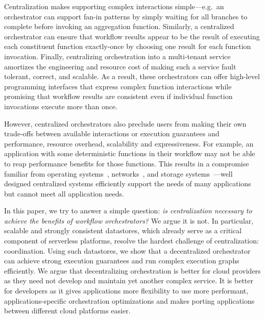 Centralization makes supporting complex interactions simple---e.g.\ an
orchestrator can support fan-in patterns by simply waiting for all branches to
complete before invoking an aggregation function. Similarly, a centralized
orchestrator can ensure that workflow results appear to be the result of
executing each constituent function exactly-once by choosing one result for
each function invocation. Finally, centralizing orchestration into a
multi-tenant service amortizes the engineering and resource cost of making such
a service fault tolerant, correct, and scalable. As a result, these
orchestrators can offer high-level programming interfaces that express complex
function interactions while promising that workflow results are consistent even
if individual function invocations execute more than once.


However, centralized orchestrators also preclude users from making their own
trade-offs between available interactions or execution guarantees and
performance, resource overhead, scalability and expressiveness. For example, an
application with some deterministic functions in their workflow may not be able
to reap performance benefits for those functions. This results in a compromise
familiar from operating systems~\cite{exokernel,spin},
networks~\cite{active-networks,sdn}, and storage
systems~\cite{comet,splinter}---well designed centralized systems efficiently
support the needs of many applications but cannot meet all application needs.
%

In this paper, we try to answer a simple question: \textit{is centralization
\emph{necessary} to achieve the benefits of workflow  orchestrators?} We argue
it is not. In particular, scalable and strongly consistent datastores, which already serve as a critical component of serverless platforms, resolve the hardest
challenge of centralization: coordination. Using such datastores, we show that a
decentralized orchestrator can achieve strong execution guarantees and run
complex execution graphs efficiently. We argue that decentralizing orchestration
is better for cloud providers as they need not develop and maintain yet another
complex service. It is better for developers as it gives applications more
flexibility to use more performant, applications-specific orchestration
optimizations and makes porting applications between different cloud platforms
easier.

